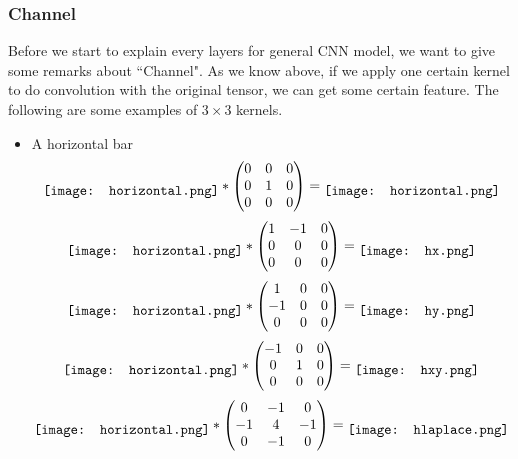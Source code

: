 \subsubsection{Channel}
Before we start to explain every layers for general CNN model, we want to give some remarks about ``Channel".   As we know above, if we apply one certain kernel to do convolution with the original tensor, we can get some certain feature. The following are some examples of $3\times 3$ kernels.
\begin{itemize}
\item A horizontal bar 
$$
\raisebox{-.5\height}{\texttt{[image: horizontal.png]}} *
\begin{pmatrix}
    0 & 0 & 0\\
    0 & 1 & 0\\
    0 & 0 & 0
\end{pmatrix} = 
\raisebox{-.5\height}{\texttt{[image: horizontal.png]}} 
$$
$$
\raisebox{-.5\height}{\texttt{[image: horizontal.png]}} *
\begin{pmatrix}
    1 & -1 & 0\\
    0 & 0 & 0\\
    0 & 0 & 0
\end{pmatrix} = 
\raisebox{-.5\height}{\texttt{[image: hx.png]}} 
$$
$$
\raisebox{-.5\height}{\texttt{[image: horizontal.png]}} *
\begin{pmatrix}
    1 & 0 & 0\\
    -1 & 0 & 0\\
    0 & 0 & 0
\end{pmatrix} = 
\raisebox{-.5\height}{\texttt{[image: hy.png]}} 
$$
$$
\raisebox{-.5\height}{\texttt{[image: horizontal.png]}} *
\begin{pmatrix}
    -1 & 0 & 0\\
    0 & 1 & 0\\
    0 & 0 & 0
\end{pmatrix} = 
\raisebox{-.5\height}{\texttt{[image: hxy.png]}} 
$$
$$
\raisebox{-.5\height}{\texttt{[image: horizontal.png]}} *
\begin{pmatrix}
    0 & -1 & 0\\
    -1 & 4 & -1\\
    0 & -1 & 0
\end{pmatrix} = 
\raisebox{-.5\height}{\texttt{[image: hlaplace.png]}} 
$$


\end{itemize}
